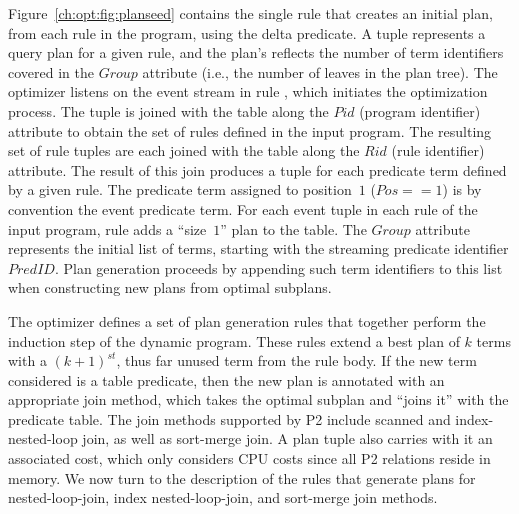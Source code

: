 Figure~\ref{ch:opt:fig:planseed} contains the single rule that creates an
initial plan, from each rule in the program, using the delta predicate.  A
 tuple represents a query plan for a given rule, and the plan's
 reflects the number of term identifiers covered in the $Group$
attribute (i.e., the number of leaves in the plan tree).  The optimizer listens
on the  event stream in rule , which
initiates the optimization process.  The  tuple is
joined with the  table along the $Pid$ (program identifier)
attribute to obtain the set of rules defined in the input program.  The
resulting set of rule tuples are each joined with the  table
along the $Rid$ (rule identifier) attribute.  The result of this join produces
a tuple for each predicate term defined by a given rule.  The predicate term
assigned to position~$1$ ($Pos == 1$) is by convention the event predicate
term.  For each event  tuple in each rule of the input
program, rule  adds a ``size~$1$'' plan to the  table.  The
$Group$ attribute represents the initial list of terms, starting with the
streaming predicate identifier $PredID$.  Plan generation proceeds by appending
such term identifiers to this list when constructing new plans from optimal
subplans.

The \OVERLOG optimizer defines a set of plan generation rules that together
perform the induction step of the dynamic program.  These rules extend a best
plan of $k$ terms with a $(k+1)^{st}$, thus far unused term from the rule body.
If the new term considered is a table predicate, then the new plan is annotated
with an appropriate join method, which takes the optimal subplan and ``joins
it'' with the predicate table.  The join methods supported by P2 include
scanned and index-nested-loop join, as well as sort-merge join.  A plan tuple
also carries with it an associated cost, which only considers CPU costs since
all P2 relations reside in memory.  We now turn to the description of the rules
that generate plans for nested-loop-join, index nested-loop-join, and
sort-merge join methods.

